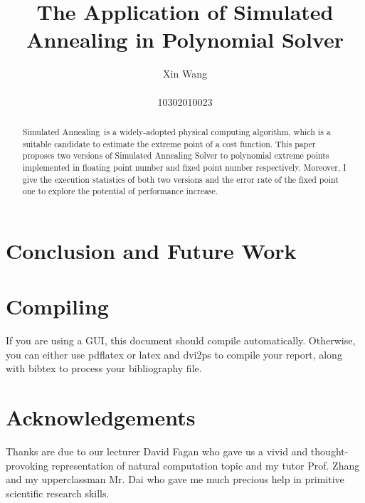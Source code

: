 \documentclass[twocolumn]{article}
\newcommand{\SA}{Simulated Annealing~}
\begin{document}
\title{{\bf The Application of Simulated Annealing in Polynomial Solver}\\ }

\author{Xin Wang\\ \vspace{0.5cm}\\
 10302010023}

\date{}
\maketitle
\begin{abstract}
\SA is a widely-adopted physical computing algorithm, which is a suitable candidate to estimate the extreme point of a cost function. This paper proposes two versions of Simulated Annealing Solver to polynomial extreme points implemented in floating point number and fixed point number respectively. Moreover, I give the execution statistics of both two versions and the error rate of the fixed point one to explore the potential of performance increase.
\end{abstract}











\section{Conclusion and Future Work}
\label{sec:conclusion}




\section{Compiling}

If you are using a GUI, this document should compile automatically. Otherwise,
you can either use pdflatex or latex and dvi2ps to compile your report, along
with bibtex to process your bibliography file.

\section{Acknowledgements}
Thanks are due to our lecturer David Fagan who gave us a vivid and thought-provoking representation of natural computation topic and my tutor Prof. Zhang and my upperclassman Mr. Dai who gave me much precious help in primitive scientific research skills.



\end{document}
